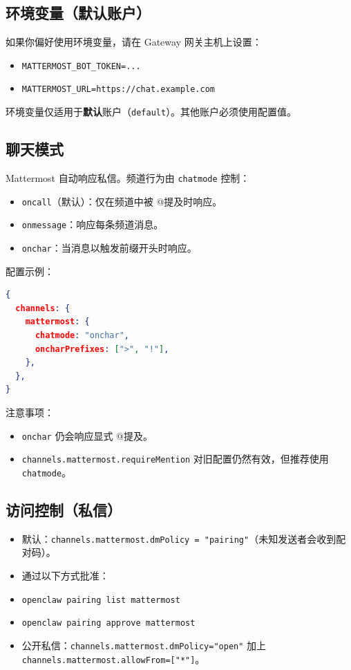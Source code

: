 \subsection{环境变量（默认账户）}


如果你偏好使用环境变量，请在 Gateway 网关主机上设置：

\begin{itemize}
  \item \texttt{MATTERMOST\_BOT\_TOKEN=...}
  \item \texttt{MATTERMOST\_URL=https://chat.example.com}
\end{itemize}


环境变量仅适用于\textbf{默认}账户（\texttt{default}）。其他账户必须使用配置值。

\subsection{聊天模式}


Mattermost 自动响应私信。频道行为由 \texttt{chatmode} 控制：

\begin{itemize}
  \item \texttt{oncall}（默认）：仅在频道中被 @提及时响应。
  \item \texttt{onmessage}：响应每条频道消息。
  \item \texttt{onchar}：当消息以触发前缀开头时响应。
\end{itemize}


配置示例：

\begin{lstlisting}[language=json]
{
  channels: {
    mattermost: {
      chatmode: "onchar",
      oncharPrefixes: [">", "!"],
    },
  },
}
\end{lstlisting}


注意事项：

\begin{itemize}
  \item \texttt{onchar} 仍会响应显式 @提及。
  \item \texttt{channels.mattermost.requireMention} 对旧配置仍然有效，但推荐使用 \texttt{chatmode}。
\end{itemize}


\subsection{访问控制（私信）}


\begin{itemize}
  \item 默认：\texttt{channels.mattermost.dmPolicy = "pairing"}（未知发送者会收到配对码）。
  \item 通过以下方式批准：
  \item \texttt{openclaw pairing list mattermost}
  \item \texttt{openclaw pairing approve mattermost }
  \item 公开私信：\texttt{channels.mattermost.dmPolicy="open"} 加上 \texttt{channels.mattermost.allowFrom=["*"]}。
\end{itemize}


